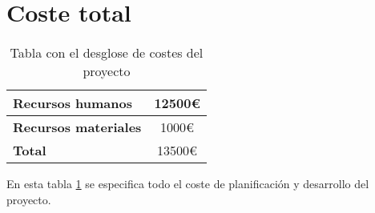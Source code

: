\section{Coste total}
\begin{table}[H]
    \centering
    \begin{tabular}{|l|c|}
        \hline
        \textbf{Recursos humanos}       & 12500\euro    \\
        \hline
        \textbf{Recursos materiales}    & 1000\euro     \\
        \hline
        \textbf{Total}                  & 13500\euro    \\
        \hline
    \end{tabular}
    \caption{Tabla con el desglose de costes del proyecto}
    \label{fg:dinero}
\end{table}
En esta tabla \ref{fg:dinero} se especifica todo el coste de planificación y desarrollo del proyecto.
\newpage
\thispagestyle{empty}